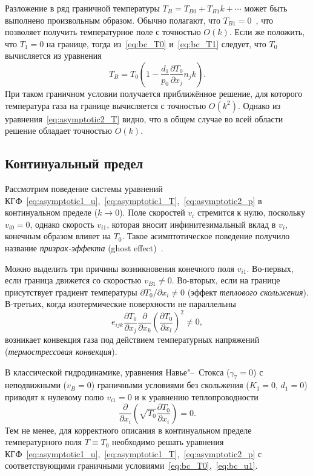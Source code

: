 \documentclass[
aps,%
12pt,%
final,%
notitlepage,%
oneside,%
onecolumn,%
nobibnotes,%
nofootinbib,%
superscriptaddress,%
noshowpacs,%
centertags]%
{revtex4}
\newcommand{\pder}[2][]{\frac{\partial#1}{\partial#2}}
\newcommand{\Pder}[2][]{\partial#1/\partial#2}
\newcommand{\OO}[1]{O\left(#1\right)}
\begin{document}
Разложение в ряд граничной температуры \(T_B = T_{B0} + T_{B1}k + \cdots\) может быть выполнено
произвольным образом. Обычно полагают, что \(T_{B1}=0\)~\cite{Kogan1976, Sone1996},
что позволяет получить температурное поле с точностью \(\OO{k}\).
Если же положить, что \(T_1=0\) на границе,
тогда из~\eqref{eq:bc_T0} и~\eqref{eq:bc_T1} следует,
что \(T_0\) вычисляется из уравнения
\begin{equation}\label{eq:boundary_temp}
    T_B = T_0 \left( 1 - \frac{d_1}{p_0}\pder[T_0]{x_j}n_j k \right).
\end{equation}
При таком граничном условии получается приближённое решение,
для которого температура газа на границе вычисляется с точностью \(\OO{k^2}\).
Однако из уравнения~\eqref{eq:asymptotic2_T} видно, что в общем случае во всей области
решение обладает точностью \(\OO{k}\).

\subsection{Континуальный предел}

Рассмотрим поведение системы уравнений КГФ~\eqref{eq:asymptotic1_u},~\eqref{eq:asymptotic1_T},~\eqref{eq:asymptotic2_p}
в континуальном пределе (\(k\to0\)).
Поле скоростей \(v_i\) стремится к нулю, поскольку \(v_{i0}=0\),
однако скорость \(v_{i1}\), которая вносит инфинитезимальный вклад в \(v_i\),
конечным образом влияет на \(T_0\).
Такое асимптотическое поведение получило название \emph{призрак-эффекта} (ghost effect)~\cite{Sone2002, Sone2007}.

Можно выделить три причины возникновения конечного поля \(v_{i1}\).
Во-первых, если граница движется со скоростью \(v_{B1}\ne0\).
Во-вторых, если на границе присутствует градиент температуры \(\Pder[T_0]{x_i}\ne0\) (эффект \emph{теплового скольжения}).
В-третьих, когда изотермические поверхности не параллельны
\begin{equation}\label{eq:nonparallel}
    e_{ijk}\pder[T_0]{x_j}\pder{x_k}\left(\pder[T_0]{x_l}\right)^2 \ne 0,
\end{equation}
возникает конвекция газа под действием температурных напряжений (\emph{термострессовая конвекция}).

В классической гидродинамике, уравнения Навье"--~Стокса (\(\gamma_7=0\))
с неподвижными (\(v_B=0\)) граничными условиями без скольжения (\(K_1=0\), \(d_1=0\))
приводят к нулевому полю \(v_{i1} = 0\) и к уравнению теплопроводности
\begin{equation}\label{eq:heat_equation}
    \pder{x_i}\left(\sqrt{T_0}\pder[T_0]{x_i}\right) = 0.
\end{equation}
Тем не менее, для корректного описания в континуальном пределе температурного поля \(T\equiv T_0\)
необходимо решать уравнения КГФ~\eqref{eq:asymptotic1_u},~\eqref{eq:asymptotic1_T},~\eqref{eq:asymptotic2_p}
с соответствующими граничными условиями~\eqref{eq:bc_T0},~\eqref{eq:bc_u1}.
\end{document}
